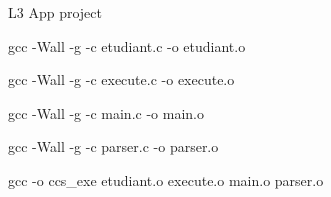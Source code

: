 L3 App project

gcc -\/Wall -\/g -\/c etudiant.\+c -\/o etudiant.\+o

gcc -\/Wall -\/g -\/c execute.\+c -\/o execute.\+o

gcc -\/Wall -\/g -\/c main.\+c -\/o main.\+o

gcc -\/Wall -\/g -\/c parser.\+c -\/o parser.\+o

gcc -\/o ccs\+\_\+exe etudiant.\+o execute.\+o main.\+o parser.\+o 